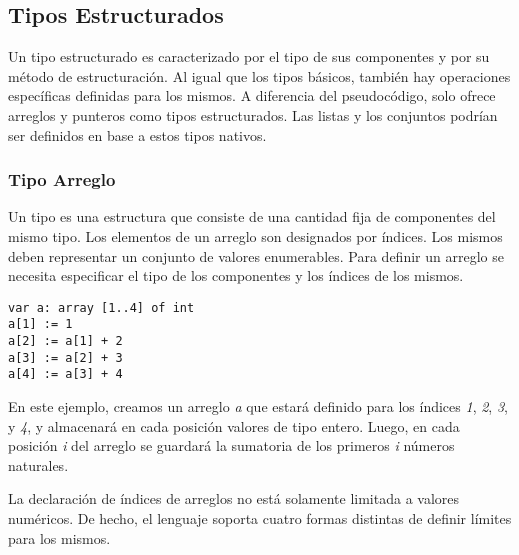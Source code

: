\documentclass{article}
\begin{document}
\subsection{Tipos Estructurados}

Un tipo estructurado es caracterizado por el tipo de sus componentes y por su método de estructuración.
Al igual que los tipos básicos, también hay operaciones específicas definidas para los mismos.
A diferencia del pseudocódigo, \Lang\space solo ofrece arreglos y punteros como tipos estructurados.
Las listas y los conjuntos podrían ser definidos en base a estos tipos nativos.

\subsubsection{Tipo Arreglo}

Un tipo  es una estructura que consiste de una cantidad fija de componentes del mismo tipo.
Los elementos de un arreglo son designados por índices.
Los mismos deben representar un conjunto de valores enumerables.
Para definir un arreglo se necesita especificar el tipo de los componentes y los índices de los mismos.
\begin{lstlisting}
var a: array [1..4] of int
a[1] := 1
a[2] := a[1] + 2
a[3] := a[2] + 3
a[4] := a[3] + 4
\end{lstlisting}

En este ejemplo, creamos un arreglo \textit{a} que estará definido para los índices \textit{1}, \textit{2}, \textit{3}, y \textit{4}, y almacenará en cada posición valores de tipo entero.
Luego, en cada posición \textit{i} del arreglo se guardará la sumatoria de los primeros \textit{i} números naturales.

La declaración de índices de arreglos no está solamente limitada a valores numéricos.
De hecho, el lenguaje soporta cuatro formas distintas de definir límites para los mismos.
\end{document}
